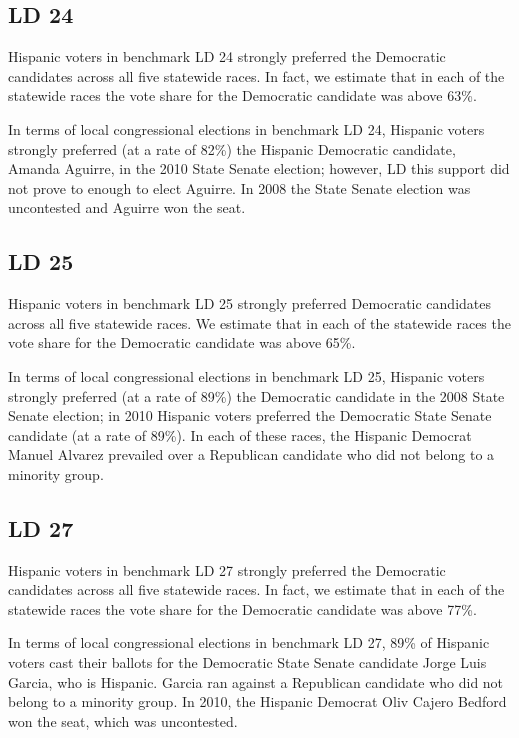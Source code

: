 \documentclass[12pt]{article}
\begin{document}
\subsection{LD 24}

Hispanic voters in benchmark LD 24 strongly preferred the Democratic
candidates across all five statewide races. In fact, we estimate that
in each of the statewide races the vote share for the Democratic
candidate was above 63\%.

In terms of local congressional elections in benchmark LD 24, Hispanic
voters strongly preferred (at a rate of 82\%) the Hispanic Democratic
candidate, Amanda Aguirre, in the 2010 State Senate election; however,
LD this support did not prove to enough to elect Aguirre. In 2008 the
State Senate election was uncontested and Aguirre won the seat.

\subsection{LD 25}

Hispanic voters in benchmark LD 25 strongly preferred Democratic
candidates across all five statewide races.  We estimate that in each
of the statewide races the vote share for the Democratic candidate was
above 65\%.

In terms of local congressional elections in benchmark LD 25, Hispanic
voters strongly preferred (at a rate of 89\%) the Democratic candidate
in the 2008 State Senate election; in 2010 Hispanic voters preferred
the Democratic State Senate candidate (at a rate of 89\%). In each of
these races, the Hispanic Democrat Manuel Alvarez prevailed over a
Republican candidate who did not belong to a minority group.

\subsection{LD 27}

Hispanic voters in benchmark LD 27 strongly preferred the Democratic
candidates across all five statewide races. In fact, we estimate that
in each of the statewide races the vote share for the Democratic
candidate was above 77\%.

In terms of local congressional elections in benchmark LD 27, 89\% of
Hispanic voters cast their ballots for the Democratic State Senate
candidate Jorge Luis Garcia, who is Hispanic. Garcia ran against a
Republican candidate who did not belong to a minority group. In 2010,
the Hispanic Democrat Oliv Cajero Bedford won the seat, which was
uncontested.
\end{document}
